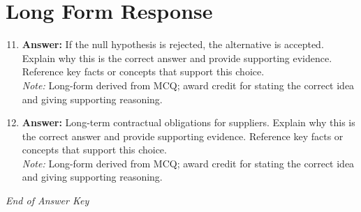 \documentclass[12pt]{article}
\begin{document}
\section*{Long Form Response}
\begin{enumerate}[label=\arabic*.]
\setcounter{enumi}{10}
\item \textbf{Answer:} If the null hypothesis is rejected, the alternative is accepted. Explain why this is the correct answer and provide supporting evidence. Reference key facts or concepts that support this choice.
\\ \textit{Note:} Long-form derived from MCQ; award credit for stating the correct idea and giving supporting reasoning.
\item \textbf{Answer:} Long-term contractual obligations for suppliers. Explain why this is the correct answer and provide supporting evidence. Reference key facts or concepts that support this choice.
\\ \textit{Note:} Long-form derived from MCQ; award credit for stating the correct idea and giving supporting reasoning.
\end{enumerate}

\vfill
\noindent\textit{End of Answer Key}
\end{document}
